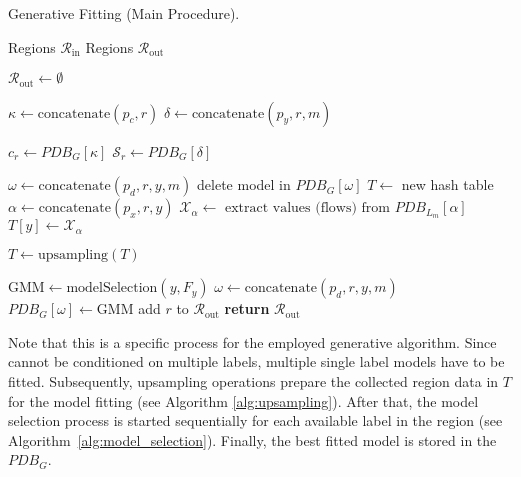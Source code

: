 \documentclass[../../main.tex]{subfiles}
\begin{document}
\begin{algorithm}
    \caption[Generative Fitting (Main Procedure)]{Generative Fitting (Main Procedure).}
    \label{alg:generative_fitting}
 
    \begin{algorithmic}[1]
        \REQUIRE Regions $\mathcal{R}_{\text{in}}$
        \ENSURE Regions $\mathcal{R}_{\text{out}}$

        \STATE $\mathcal{R}_{\text{out}} \leftarrow \emptyset$


            \STATE $\kappa \leftarrow \text{concatenate}(p_c, r)$
            \STATE $\delta \leftarrow \text{concatenate}(p_y, r, m)$

            \STATE $c_r \leftarrow PDB_G[\kappa]$
            \STATE $\mathcal{S}_r \leftarrow PDB_G[\delta]$ 

                    \STATE $\omega \leftarrow \text{concatenate}(p_d, r, y, m)$ 
                    \STATE delete model in $PDB_G[\omega]$
                \ENDFOR
            \ELSE
                \STATE $T \leftarrow$ new hash table
                    \STATE $\alpha \leftarrow \text{concatenate}(p_x, r, y)$
                    \STATE $\mathcal{X}_\alpha \leftarrow \text{ extract values (flows) from } PDB_{L_m}[\alpha]$
                    \STATE $T[y] \leftarrow \mathcal{X}_\alpha$
                \ENDFOR

                \STATE $T \leftarrow \text{upsampling}(T)$

                    \STATE $\text{GMM} \leftarrow \text{modelSelection}(y, F_y)$
                    \STATE $\omega \leftarrow \text{concatenate}(p_d, r, y, m)$ 
                    \STATE $PDB_G[\omega] \leftarrow \text{GMM}$
                \ENDFOR
                \STATE add $r$ to $\mathcal{R}_{\text{out}}$
            \ENDIF
        \ENDFOR
        \STATE \textbf{return} $\mathcal{R}_{\text{out}}$
    \end{algorithmic}
 \end{algorithm}

 
 Note that this is a specific process for the employed generative algorithm. Since  cannot be conditioned on multiple labels, multiple single label models have to be fitted. Subsequently, upsampling operations prepare the collected region data in $T$ for the model fitting (see Algorithm \ref{alg:upsampling}). After that, the model selection process is started sequentially for each available label in the region (see Algorithm~\ref{alg:model_selection}). Finally, the best fitted model is stored in the $PDB_G$. 
\end{document}
